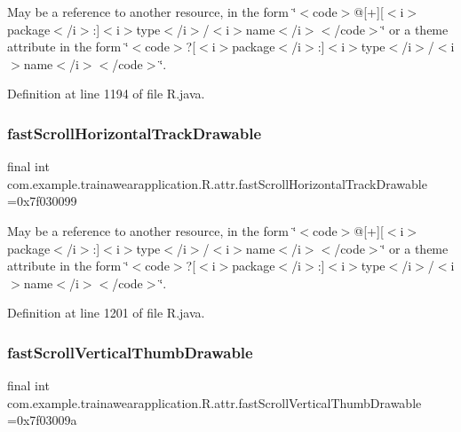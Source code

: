May be a reference to another resource, in the form \char`\"{}$<$code$>$@\mbox{[}+\mbox{]}\mbox{[}$<$i$>$package$<$/i$>$\+:\mbox{]}$<$i$>$type$<$/i$>$/$<$i$>$name$<$/i$>$$<$/code$>$\char`\"{} or a theme attribute in the form \char`\"{}$<$code$>$?\mbox{[}$<$i$>$package$<$/i$>$\+:\mbox{]}$<$i$>$type$<$/i$>$/$<$i$>$name$<$/i$>$$<$/code$>$\char`\"{}. 

Definition at line 1194 of file R.\+java.

\mbox{\label{classcom_1_1example_1_1trainawearapplication_1_1_r_1_1attr_a7bf86194cbd55186f25ee2e6391f9aae}} 
\subsubsection{\texorpdfstring{fastScrollHorizontalTrackDrawable}{fastScrollHorizontalTrackDrawable}}
{\footnotesize\ttfamily final int com.\+example.\+trainawearapplication.\+R.\+attr.\+fast\+Scroll\+Horizontal\+Track\+Drawable =0x7f030099\hspace{0.3cm}{\ttfamily [static]}}

May be a reference to another resource, in the form \char`\"{}$<$code$>$@\mbox{[}+\mbox{]}\mbox{[}$<$i$>$package$<$/i$>$\+:\mbox{]}$<$i$>$type$<$/i$>$/$<$i$>$name$<$/i$>$$<$/code$>$\char`\"{} or a theme attribute in the form \char`\"{}$<$code$>$?\mbox{[}$<$i$>$package$<$/i$>$\+:\mbox{]}$<$i$>$type$<$/i$>$/$<$i$>$name$<$/i$>$$<$/code$>$\char`\"{}. 

Definition at line 1201 of file R.\+java.

\mbox{\label{classcom_1_1example_1_1trainawearapplication_1_1_r_1_1attr_a5e1c7b7a26aa361b918f3f1c305cae4d}} 
\subsubsection{\texorpdfstring{fastScrollVerticalThumbDrawable}{fastScrollVerticalThumbDrawable}}
{\footnotesize\ttfamily final int com.\+example.\+trainawearapplication.\+R.\+attr.\+fast\+Scroll\+Vertical\+Thumb\+Drawable =0x7f03009a\hspace{0.3cm}{\ttfamily [static]}}

